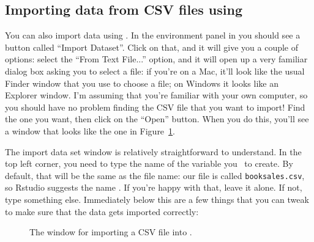 \subsection{Importing data from CSV files using \Rstudio}

You can also import data using \Rstudio. In the environment panel in \Rstudio you should see a button called ``Import Dataset''. Click on that, and it will give you a couple of options: select the ``From Text File...'' option, and it will open up a very familiar dialog box asking you to select a file: if you're on a Mac, it'll look like the usual Finder window that you use to choose a file; on Windows it looks like an Explorer window.
I'm assuming that you're familiar with your own computer, so you should have no problem finding the CSV file that you want to import! Find the one you want, then click on the ``Open'' button. When you do this, you'll see a window that looks like the one in Figure~\ref{fig:import}.


The import data set window is relatively straightforward to understand. In the top left corner, you need to type the name of the variable you \R\ to create. By default, that will be the same as the file name: our file is called \texttt{booksales.csv}, so Rstudio suggests the name . If you're happy with that, leave it alone. If not, type something else. Immediately below this are a few things that you can tweak to make sure that the data gets imported correctly: 

\begin{figure}[th]
	\begin{center}
		\caption{The \Rstudio window for importing a CSV file into \R.}
		\label{fig:import}
	\end{center}
\end{figure} 

